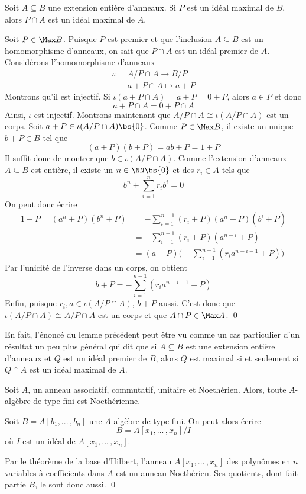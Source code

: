 \begin{Lem} \label{entiermax} Soit $A \subseteq B$ une extension entière d'anneaux. Si $P$ est un idéal maximal de $B$, alors $P \cap A$ est un idéal maximal de $A$.
\begin{pre} Soit $P \in \Max B$. Puisque $P$ est premier et que l'inclusion $A \subseteq B$ est un homomorphisme d'anneaux, on sait que $P \cap A$ est un idéal premier de $A$. Considérons l'homomorphisme d'anneaux 
\begin{align*}
\iota : \; &A / P \cap A \longrightarrow B / P\\
&a + P \cap A \mapsto a + P
\end{align*}
Montrons qu'il est injectif. Si $\iota (a + P \cap A) = a + P = 0 + P$, alors $a \in P$ et donc 
$$ a + P \cap A = 0 + P \cap A $$
Ainsi, $\iota$ est injectif. Montrons maintenant que $A / P \cap A \cong \iota(A / P \cap A)$ est un corps. Soit $a + P \in \iota(A / P \cap A) \bs \{0\}$. Comme $P \in \Max B$, il existe un unique $b + P \in B$ tel que 
$$ (a + P)(b + P) = ab + P = 1 + P $$
Il suffit donc de montrer que $b \in \iota(A / P \cap A)$. Comme l'extension d'anneaux $A \subseteq B$ est entière, il existe un $n \in \NN \bs \{0\}$ et des $r_i \in A$ tels que
$$ b^n + \sum_{i=1}^n r_i b^i = 0 $$
On peut donc écrire 
\begin{align*}
1 + P = (a^n + P)(b^n + P) &= - \sum_{i=1}^{n-1} (r_i + P)(a^n + P)(b^i + P)\\
&= - \sum_{i=1}^{n-1} (r_i + P)(a^{n-i} + P)\\
&= (a + P)\Big(- \sum_{i=1}^{n-1} (r_ia^{n - i - 1} + P)\Big)
\end{align*}
Par l'unicité de l'inverse dans un corps, on obtient
$$ b + P = - \sum_{i=1}^{n-1} (r_ia^{n - i - 1} + P) $$
Enfin, puisque $r_i, a \in \iota(A / P \cap A)$, $b + P$ aussi. C'est donc que $\iota(A / P \cap A) \cong A / P \cap A$ est un corps et que $A \cap P \in \Max A$. \qed
\end{pre}
\end{Lem}

\begin{Rem} En fait, l'énoncé du lemme précédent peut être vu comme un cas particulier d'un résultat un peu plus général qui dit que si $A \subseteq B$ est une extension entière d'anneaux et $Q$ est un idéal premier de $B$, alors $Q$ est maximal si et seulement si $Q \cap A$ est un idéal maximal de $A$.
\end{Rem}


\begin{Lem} Soit $A$, un anneau associatif, commutatif, unitaire et Noethérien. Alors, toute $A$-algèbre de type fini est Noethérienne.
\begin{pre} Soit $B = A[b_1,...\,,b_n]$ une $A$ algèbre de type fini. On peut alors écrire $$ B = A[x_1,...\,,x_n]/I $$
où $I$ est un idéal de $A[x_1,...\,,x_n]$.

Par le théorème de la base d'Hilbert, l'anneau $A[x_1,...\,,x_n]$ des polynômes en $n$ variables à coefficients dans $A$ est un anneau Noethérien. Ses quotients, dont fait partie $B$, le sont donc aussi. \qed
\end{pre}
\end{Lem}

